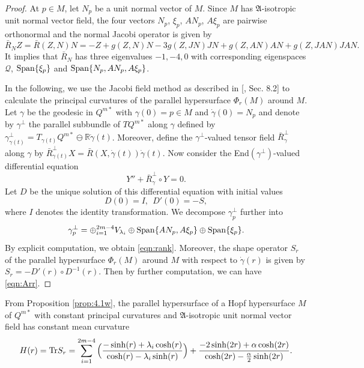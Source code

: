 \documentclass[reqno]{amsart}%
\theoremstyle{definition}
\numberwithin{equation}{section}
\begin{document}
\begin{proof}
At $p\in M$, let $N_p$ be a unit normal vector of $M$. Since $M$ has $\mathfrak{A}$-isotropic unit normal vector field, the four vectors
$N_p$, $\xi_p$, $AN_p$, $A\xi_p$ are pairwise orthonormal and the normal Jacobi operator
is given by
$$
\bar{R}_NZ=\bar{R}(Z,N)N=-Z+g(Z,N)N-3g(Z,JN)JN+g(Z,AN)AN+g(Z,JAN)JAN.
$$
It implies that $\bar{R}_N$ has three eigenvalues $ -1, -4, 0$ with corresponding
eigenspaces $\mathcal{Q}$, ${\rm Span}\{\xi_p\}$ and ${\rm Span}\{N_p,AN_p,A\xi_p\}$.

In the following, we use the Jacobi field method as described in [\cite{B-C-O}, Sec. 8.2]
to calculate the principal curvatures of the parallel hypersurface $\Phi_r(M)$ around
$M$. Let $\gamma$ be the
geodesic in $Q^{m*}$ with $\gamma(0)=p\in M$ and $\dot{\gamma}(0)=N_p$ and denote by $\gamma^\perp$ the parallel
subbundle of $TQ^{m*}$ along $\gamma$ defined by $\gamma^\perp_{\gamma(t)}
=T_{\gamma(t)}Q^{m*}\ominus \mathbb{R}\dot{\gamma}(t)$. Moreover, define
the $\gamma^\perp$-valued tensor field $\bar{R}^\perp_{\gamma}$ along $\gamma$ by
$\bar{R}^\perp_{\gamma(t)}X=\bar{R}(X,\dot{\gamma}(t))\dot{\gamma}(t)$. Now consider
the End$(\gamma^\perp)$-valued differential equation
$$
Y''+\bar{R}^\perp_\gamma\circ Y=0.
$$
Let $D$ be the unique solution of this differential equation with initial values
$$
D(0)=I,\ \ D'(0)=-S,
$$
where $I$ denotes the identity transformation. We decompose $\gamma^\perp_p$ further into
$$
\gamma^\perp_p=\oplus_{i=1}^{2m-4} V_{\lambda_i}\oplus{\rm Span}\{AN_p,A\xi_p\}\oplus{\rm Span}\{\xi_p\}.
$$
By explicit computation, we obtain \eqref{eqn:rank}. Moreover, the
shape operator $S_r$ of the parallel hypersurface $\Phi_r(M)$ around $M$ with respect to
$\dot{\gamma}(r)$ is given by $S_r=-D'(r)\circ D^{-1}(r)$.
Then by further computation, we can have \eqref{eqn:Arr}.
\end{proof}

From Proposition \ref{prop:4.1w}, the parallel hypersurface of a Hopf hypersurface $M$ of $Q^{m*}$ with constant principal curvatures and $\mathfrak{A}$-isotropic unit normal vector field has constant mean curvature
\begin{equation}\label{eqn:Hr}
H(r)={\rm Tr}S_r=\sum_{i=1}^{2m-4}\Big(\frac{-\sinh(r)+\lambda_i\cosh(r)}{\cosh(r)-\lambda_i\sinh(r)}\Big)
+\frac{-2\sinh(2r)+\alpha\cosh(2r)}{\cosh(2r)-\frac{\alpha}{2}\sinh(2r)}.
\end{equation}
\end{document}
